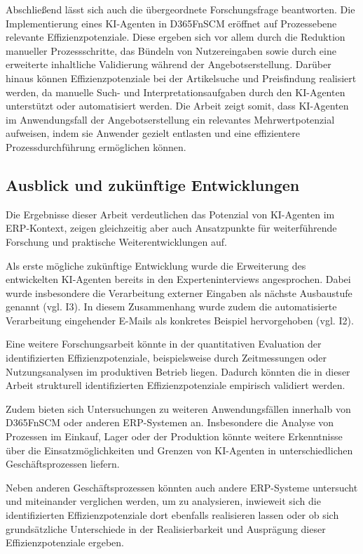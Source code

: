 Abschließend lässt sich auch die übergeordnete Forschungsfrage beantworten.
Die Implementierung eines \ac{KI}-Agenten in \ac{D365FnSCM} eröffnet auf Prozessebene relevante Effizienzpotenziale. Diese ergeben sich vor allem durch die Reduktion manueller Prozessschritte, das Bündeln von Nutzereingaben sowie durch eine erweiterte inhaltliche Validierung während der Angebotserstellung. Darüber hinaus können Effizienzpotenziale bei der Artikelsuche und Preisfindung realisiert werden, da manuelle Such- und Interpretationsaufgaben durch den \ac{KI}-Agenten unterstützt oder automatisiert werden. Die Arbeit zeigt somit, dass \ac{KI}-Agenten im Anwendungsfall der Angebotserstellung ein relevantes Mehrwertpotenzial aufweisen, indem sie Anwender gezielt entlasten und eine effizientere Prozessdurchführung ermöglichen können.

\subsection{Ausblick und zukünftige Entwicklungen}

Die Ergebnisse dieser Arbeit verdeutlichen das Potenzial von \ac{KI}-Agenten im \ac{ERP}-Kontext, zeigen gleichzeitig aber auch Ansatzpunkte für weiterführende Forschung und praktische Weiterentwicklungen auf.

Als erste mögliche zukünftige Entwicklung wurde die Erweiterung des entwickelten \ac{KI}-Agenten bereits in den Experteninterviews angesprochen. Dabei wurde insbesondere die Verarbeitung externer Eingaben als nächste Ausbaustufe genannt (vgl. I3). In diesem Zusammenhang wurde zudem die automatisierte Verarbeitung eingehender E-Mails als konkretes Beispiel hervorgehoben (vgl. I2).

Eine weitere Forschungsarbeit könnte in der quantitativen Evaluation der identifizierten Effizienzpotenziale, beispielsweise durch Zeitmessungen oder Nutzungsanalysen im produktiven Betrieb liegen. Dadurch könnten die in dieser Arbeit strukturell identifizierten Effizienzpotenziale empirisch validiert werden.

Zudem bieten sich Untersuchungen zu weiteren Anwendungsfällen innerhalb von \ac{D365FnSCM} oder anderen \ac{ERP}-Systemen an. Insbesondere die Analyse von Prozessen im Einkauf, Lager oder der Produktion könnte weitere Erkenntnisse über die Einsatzmöglichkeiten und Grenzen von \ac{KI}-Agenten in unterschiedlichen Geschäftsprozessen liefern.

Neben anderen Geschäftsprozessen könnten auch andere \ac{ERP}-Systeme untersucht und miteinander verglichen werden, um zu analysieren, inwieweit sich die identifizierten Effizienzpotenziale dort ebenfalls realisieren lassen oder ob sich grundsätzliche Unterschiede in der Realisierbarkeit und Ausprägung dieser Effizienzpotenziale ergeben.